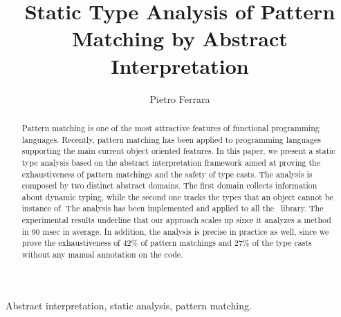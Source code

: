 \documentclass{llncs}
\newenvironment{keywords}{
       \list{}{\advance\topsep by0.35cm\relax\small
       \leftmargin=1cm
       \labelwidth=0.35cm
       \listparindent=0.35cm
       \itemindent\listparindent
       \rightmargin\leftmargin}\item[\hskip\labelsep
                                     \bfseries Key words:]}
{\endlist}
\begin{document}
\title{Static Type Analysis of Pattern Matching by Abstract Interpretation}

\author{Pietro Ferrara}

\maketitle

\begin{abstract}
Pattern matching is one of the most attractive features of functional programming languages. Recently, pattern matching has been applied to programming languages supporting the main current object oriented features. In this paper, we present a static type analysis based on the abstract interpretation framework aimed at proving the exhaustiveness of pattern matchings and the safety of type casts. The analysis is composed by two distinct abstract domains. The first domain collects information about dynamic typing, while the second one tracks the types that an object cannot be instance of. The analysis has been implemented and applied to all the \Scala\ library. The experimental results underline that our approach scales up since it analyzes a method in 90 msec in average. In addition, the analysis is precise in practice as well, since we prove the exhaustiveness of 42\% of pattern matchings and 27\% of the type casts without any manual annotation on the code.
\end{abstract}
\begin{keywords}
Abstract interpretation, static analysis, pattern matching.
\end{keywords}
\end{document}
